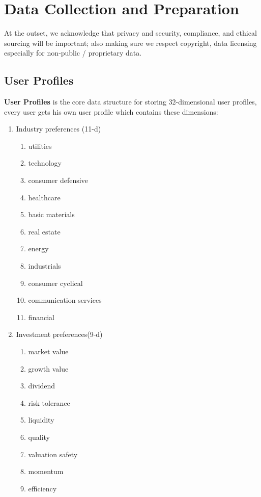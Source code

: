 \chapter{Data Collection and Preparation}

At the outset, we acknowledge that privacy and security, compliance, and ethical sourcing will be important; also making sure we respect copyright, data licensing especially for non‐public / proprietary data.

\section{User Profiles}

\textbf{User Profiles} is the core data structure for storing 32-dimensional user profiles, every user gets his own user profile which contains these dimensions:

\begin{enumerate}
	\item Industry preferences (11-d)
    \begin{enumerate}
        \item utilities
        \item technology
        \item consumer defensive
        \item healthcare
        \item basic materials
        \item real estate
        \item energy
        \item industrials
        \item consumer cyclical
        \item communication services
        \item financial
    \end{enumerate}
	\item Investment preferences(9-d)
    \begin{enumerate}
        \item market value
        \item growth value
        \item dividend
        \item risk tolerance
        \item liquidity
        \item quality
        \item valuation safety
        \item momentum
        \item efficiency
    \end{enumerate}
\end{enumerate}

